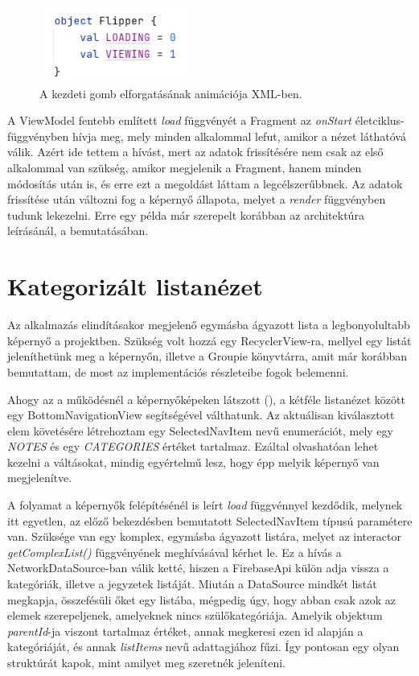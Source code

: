 \begin{figure}[!ht]
	\centering
	\includegraphics[width=50mm, keepaspectratio]{figures/viewflipper_object.png}
	\caption{A kezdeti gomb elforgatásának animációja XML-ben.}
	\label{fig:ViewFlipperObject}
\end{figure}

A ViewModel fentebb említett \emph{load} függvényét a Fragment az \emph{onStart} életciklus-függvényben hívja meg, mely minden alkalommal lefut, amikor a nézet láthatóvá válik. Azért ide tettem a hívást, mert az adatok frissítésére nem csak az első alkalommal van szükség, amikor megjelenik a Fragment, hanem minden módosítás után is, és erre ezt a megoldást láttam a legcélszerűbbnek. Az adatok frissítése után változni fog a képernyő állapota, melyet a \emph{render} függvényben tudunk lekezelni. Erre egy példa már szerepelt korábban az architektúra leírásánál, a  bemutatásában.

\section{Kategorizált listanézet}
Az alkalmazás elindításakor megjelenő egymásba ágyazott lista a legbonyolultabb képernyő a projektben. Szükség volt hozzá egy RecyclerView-ra, mellyel egy listát jeleníthetünk meg a képernyőn, illetve a Groupie könyvtárra, amit már korábban bemutattam, de most az implementációs részleteibe fogok belemenni. 

Ahogy az a működésnél a képernyőképeken látszott (), a kétféle listanézet között egy BottomNavigationView segítségével válthatunk. Az aktuálisan kiválasztott elem követésére létrehoztam egy SelectedNavItem nevű enumerációt, mely egy \emph{NOTES} és egy \emph{CATEGORIES} értéket tartalmaz. Ezáltal olvashatóan lehet kezelni a váltásokat, mindig egyértelmű lesz, hogy épp melyik képernyő van megjelenítve.

A folyamat a képernyők felépítésénél is leírt \emph{load} függvénnyel kezdődik, melynek itt egyetlen, az előző bekezdésben bemutatott SelectedNavItem típusú paramétere van. Szüksége van egy komplex, egymásba ágyazott listára, melyet az interactor \emph{getComplexList()} függvényének meghívásával kérhet le. Ez a hívás a NetworkDataSource-ban válik ketté, hiszen a FirebaseApi külön adja vissza a kategóriák, illetve a jegyzetek listáját. Miután a DataSource mindkét listát megkapja, összefésüli őket egy listába, mégpedig úgy, hogy abban csak azok az elemek szerepeljenek, amelyeknek nincs szülőkategóriája. Amelyik objektum \emph{parentId}-ja viszont tartalmaz értéket, annak megkeresi ezen id alapján a kategóriáját, és annak \emph{listItems} nevű adattagjához fűzi. Így pontosan egy olyan struktúrát kapok, mint amilyet meg szeretnék jeleníteni.

